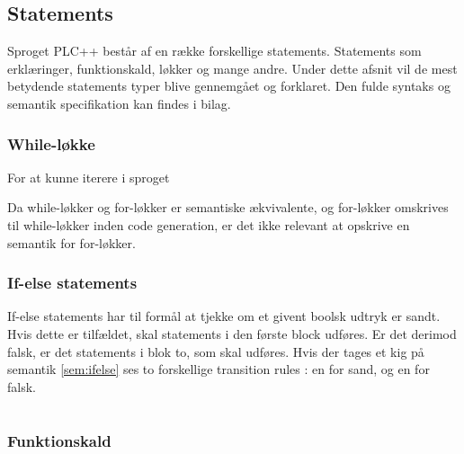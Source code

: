 \noindent \subsection{Statements}
Sproget PLC++ består af en række forskellige statements. Statements som erklæringer, funktionskald, løkker og mange andre. Under dette afsnit vil de mest betydende statements typer blive gennemgået og forklaret. Den fulde syntaks og semantik specifikation kan findes i bilag.





\noindent \subsubsection{While-løkke}
For at kunne iterere i sproget 


    
Da while-løkker og for-løkker er semantiske ækvivalente, og for-løkker omskrives til while-løkker inden code generation, er det ikke relevant at opskrive en semantik for for-løkker.

\noindent \subsubsection{If-else statements}

If-else statements har til formål at tjekke om et givent boolsk udtryk er sandt. Hvis dette er tilfældet, skal statements i den første block udføres. Er det derimod falsk, er det statements i blok to, som skal udføres. Hvis der tages et kig på semantik \ref{sem:ifelse} ses to forskellige transition rules : en for sand, og en for falsk. 



\begin{semantik}
    \bgroup
    \def\arraystretch{3}
    \begin{table}[H]
    \centering
    \begin{tabular}{l c l}
        
        
        
    \end{tabular}
    \end{table}
    \egroup
    \caption{If-else statement}
    \label{sem:ifelse}
\end{semantik}
    
\noindent \subsubsection{Funktionskald}

